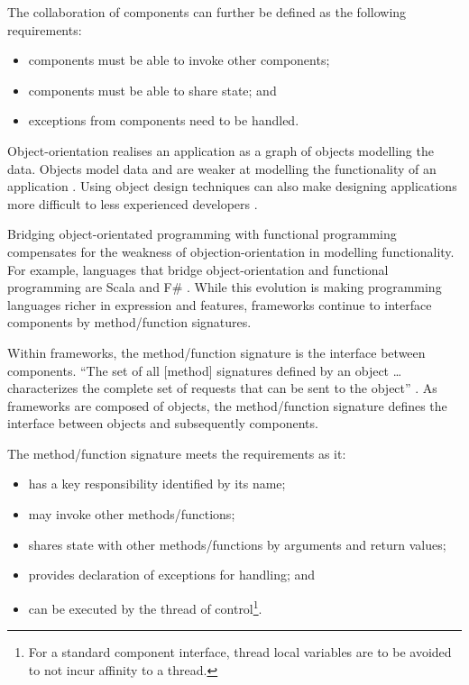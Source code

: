 \documentclass[prodmode]{style/acmlarge}
\begin{document}
The collaboration of components can further be defined as the following
requirements:
\begin{itemize}
  \item components must be able to invoke other components;
  \item components must be able to share state; and
  \item exceptions from components need to be handled.
\end{itemize}

Object-orientation realises an application as a graph of objects modelling the
data.  Objects model data and are weaker at modelling the functionality of an
application \cite{oo-behaviour}.  Using object design techniques can also make
designing applications more difficult to less experienced developers
\cite{oo-design}.

Bridging object-orientated programming with functional programming
\cite{bridging-function-oo} compensates for the weakness of
objection-orientation in modelling functionality.  For example, languages that
bridge object-orientation and functional programming are Scala \cite{scala} and
F\# \cite{f-sharp}.  While this evolution is making programming languages richer
in expression and features, frameworks continue to interface components by
method/function signatures.

Within frameworks, the method/function signature is the interface between
components.  ``The set of all [method] signatures defined by an object \ldots
characterizes the complete set of requests that can be sent to the object''
\cite[p. 13]{gof}.  As frameworks are composed of objects, the method/function
signature defines the interface between objects and subsequently components.

The method/function signature meets the requirements as it:
\begin{itemize}
  \item has a key responsibility identified by its name;
  \item may invoke other methods/functions;
  \item shares state with other methods/functions by arguments and return values;
  \item provides declaration of exceptions for handling; and
  \item can be executed by the thread of control\footnote{For a standard component interface, thread local variables are to be avoided to not incur affinity to a thread.}.
\end{itemize}
\end{document}

